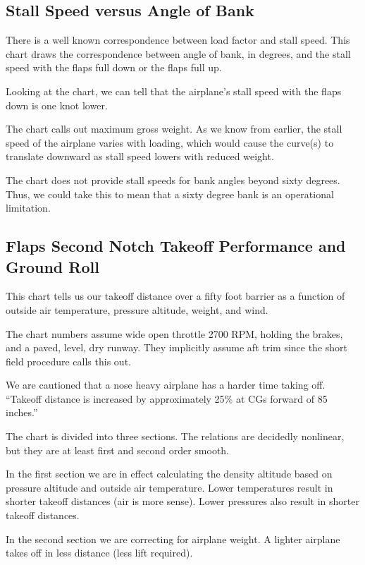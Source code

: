 \subsection{Stall Speed versus Angle of Bank}

There is a well known correspondence between load factor and stall speed. This chart draws the correspondence between angle of bank, in degrees, and the stall speed with the flaps full down or the flaps full up.

Looking at the chart, we can tell that the airplane's stall speed with the flaps down is one knot lower.

The chart calls out maximum gross weight. As we know from earlier, the stall speed of the airplane varies with loading, which would cause the curve(s) to translate downward as stall speed lowers with reduced weight.

The chart does not provide stall speeds for bank angles beyond sixty degrees. Thus, we could take this to mean that a sixty degree bank is an operational limitation.

\subsection{Flaps Second Notch Takeoff Performance and Ground Roll}

This chart tells us our takeoff distance over a fifty foot barrier as a function of outside air temperature, pressure altitude, weight, and wind.

The chart numbers assume wide open throttle 2700 RPM, holding the brakes, and a paved, level, dry runway. They implicitly assume aft trim since the short field procedure calls this out.

We are cautioned that a nose heavy airplane has a harder time taking off. ``Takeoff distance is increased by approximately 25\% at CGs forward of 85 inches.'' 

The chart is divided into three sections. The relations are decidedly nonlinear, but they are at least first and second order smooth.

In the first section we are in effect calculating the density altitude based on pressure altitude and outside air temperature. Lower temperatures result in shorter takeoff distances (air is more sense). Lower pressures also result in shorter takeoff distances.

In the second section we are correcting for airplane weight. A lighter airplane takes off in less distance (less lift required).

